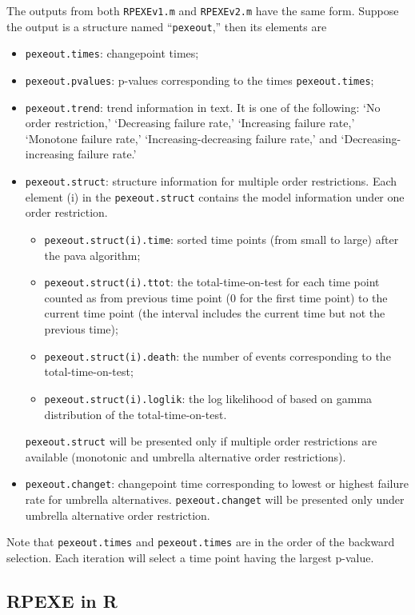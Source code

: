 \documentclass[12pt] {article}
\begin{document}
The outputs from both {\tt RPEXEv1.m} and
{\tt RPEXEv2.m} have the same form. Suppose the output is a
structure named ``{\tt pexeout},'' then its elements are
\begin{itemize}
\item {\tt pexeout.times}: changepoint times;
\item {\tt pexeout.pvalues}: p-values corresponding to the times {\tt pexeout.times};
\item {\tt pexeout.trend}:  trend information in text. It is one of the following: `No order restriction,' `Decreasing failure rate,' `Increasing failure rate,' `Monotone failure rate,'
     `Increasing-decreasing failure rate,'  and `Decreasing-increasing failure rate.'
\item {\tt pexeout.struct}:  structure information for multiple order restrictions.
    Each element (i) in the {\tt pexeout.struct} contains the model information under one     order restriction.
    \begin{itemize}
        \item {\tt pexeout.struct(i).time}: sorted time points (from small to large) after the pava algorithm;
        \item {\tt pexeout.struct(i).ttot}: the total-time-on-test for each time point counted as from previous time point (0 for the first time point) to the current time point (the interval includes the current time but not the previous time);
        \item {\tt pexeout.struct(i).death}: the number of events corresponding to the total-time-on-test;
        \item {\tt pexeout.struct(i).loglik}: the log likelihood of based on gamma distribution of the total-time-on-test.
    \end{itemize}
    {\tt pexeout.struct} will be presented only if multiple order restrictions are available (monotonic and umbrella alternative order restrictions).
\item {\tt pexeout.changet}: changepoint time corresponding to lowest or highest failure rate for umbrella alternatives.
    {\tt pexeout.changet} will be presented only under umbrella alternative order restriction.
\end{itemize}
Note that {\tt pexeout.times} and {\tt pexeout.times} are in the order of the backward selection. Each iteration will select a time point having the largest p-value.

\subsection{RPEXE in R}
\label{sec3.2}
\end{document}

